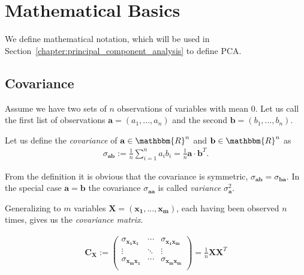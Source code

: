 \chapter{Mathematical Basics}
\label{chapter:mathematical_basics}

We define mathematical notation, which will be used in Section~\ref{chapter:principal_component_analysis} to define PCA.

\section{Covariance}
\label{sec:covariance}

Assume we have two sets of $n$ observations of variables with mean $0$. Let us call the first list of observations $\mathbf{a} = (a_1, ..., a_n)$ and the second $\mathbf{b} = (b_1, ..., b_n)$.

\begin{definition}[Covariance]
	Let us define the \textit{covariance} of $\mathbf{a} \in \mathbbm{R}^n$ and $\mathbf{b} \in \mathbbm{R}^n$ as
	\begin{align*}
		\sigma_{\mathbf{ab}} := \frac{1}{n} \sum_{i=1}^{n}a_ib_i = \frac{1}{n}\mathbf{a}\cdot\mathbf{b}^T.
	\end{align*}
\end{definition}

From the definition it is obvious that the covariance is symmetric, $\sigma_{\mathbf{ab}} = \sigma_{\mathbf{ba}}$. In the special case $\mathbf{a} = \mathbf{b}$ the covariance $\sigma_{\mathbf{aa}}$ is called \textit{variance} $\sigma_{\mathbf{a}}^2$.

\begin{definition}
	Generalizing to $m$ variables $\mathbf{X} = (\mathbf{x_1}, ..., \mathbf{x_m})$, each having been observed $n$ times, gives us the \textit{covariance matrix}.
	
	\begin{align*}
		\mathbf{C_X} := \left(\begin{matrix}
			\sigma_{\mathbf{x_1x_1}}	& \cdots & \sigma_{\mathbf{x_1x_m}}	\\
			\vdots						& \ddots & \vdots					\\
			\sigma_{\mathbf{x_mx_1}}	& \cdots & \sigma_{\mathbf{x_mx_m}}	\\
		\end{matrix}\right) = \frac{1}{n} \mathbf{X}\mathbf{X}^T
	\end{align*}
\end{definition}

